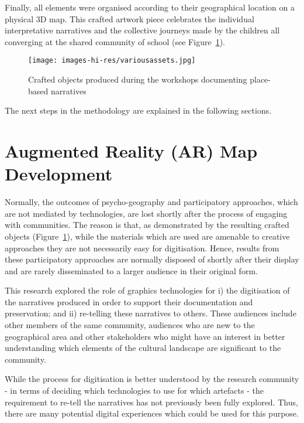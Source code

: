 \documentclass{egpubl}
\begin{document}
Finally, all elements were organised according to their geographical location
on a physical 3D map. This crafted artwork piece celebrates the individual
interpretative narratives and the collective journeys made by the children all
converging at the shared community of school (see Figure~\ref{fig:artwork}). 

\begin{figure}[ht] \centering
\texttt{[image: images-hi-res/variousassets.jpg]}
\caption{Crafted objects produced during the workshops documenting place-based
narratives} \label{fig:artwork} \end{figure}

The next steps in the methodology are explained in the following sections.

\section{Augmented Reality (AR) Map Development} \label{tech} Normally, the
outcomes of psycho-geography and participatory approaches, which are not
mediated by technologies, are lost shortly after the process of engaging with
communities. The reason is that, as demonstrated by the resulting crafted
objects (Figure~\ref{fig:artwork}), while the materials which are used  are
amenable to creative approaches they are not necessarily easy for
digitisation. Hence, results from these participatory approaches are normally
disposed of shortly after their display and are rarely disseminated to
 a larger audience in their original form. 

This research explored the role of graphics technologies for i) the
digitisation of the narratives produced in order to support their
documentation and preservation; and ii) re-telling these narratives to others.
These audiences include other members of the same community, audiences who are
new to the geographical area and other stakeholders who might have an interest
in better understanding which elements of the cultural landscape are
significant to the community.

While the process for digitisation is better understood by the research
community - in terms of deciding which technologies to use for which artefacts
- the requirement to re-tell the narratives has not previously been fully
explored. Thus, there are many potential digital experiences which could be
used for this purpose. 
\end{document}

